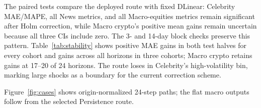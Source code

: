 The paired tests compare the deployed route with fixed DLinear: Celebrity MAE/MAPE, all News metrics, and all Macro-equities metrics remain significant after Holm correction, while Macro crypto's positive mean gains remain uncertain because all three CIs include zero. The 3- and 14-day block checks preserve this pattern. Table~\ref{tab:stability} shows positive MAE gains in both test halves for every cohort and gains across all horizons in three cohorts; Macro crypto retains gains at 17--20 of 24 horizons. The route loses in Celebrity's high-volatility bin, marking large shocks as a boundary for the current correction scheme.

Figure~\ref{fig:cases} shows origin-normalized 24-step paths; the flat macro outputs follow from the selected Persistence route.
